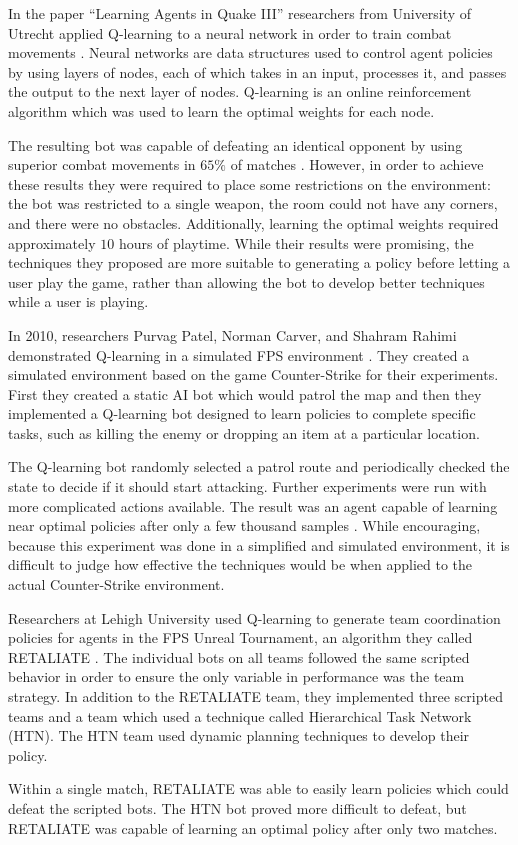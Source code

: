 In the paper ``Learning Agents in Quake III'' researchers from University of Utrecht applied Q-learning to a neural network in order to train combat movements \cite{q3combat}. Neural networks are data structures used to control agent policies by using layers of nodes, each of which takes in an input, processes it, and passes the output to the next layer of nodes. Q-learning is an online reinforcement algorithm which was used to learn the optimal weights for each node.

The resulting bot was capable of defeating an identical opponent by using superior combat movements in $65\%$ of matches \cite{q3combat}. However, in order to achieve these results they were required to place some restrictions on the environment: the bot was restricted to a single weapon, the room could not have any corners, and there were no obstacles. Additionally, learning the optimal weights required approximately $10$ hours of playtime. While their results were promising, the techniques they proposed are more suitable to generating a policy before letting a user play the game, rather than allowing the bot to develop better techniques while a user is playing.

In 2010, researchers Purvag Patel, Norman Carver, and Shahram Rahimi demonstrated Q-learning in a simulated FPS environment \cite{game:ai:learning}. They created a simulated environment based on the game Counter-Strike for their experiments. First they created a static AI bot which would patrol the map and then they implemented a Q-learning bot designed to learn policies to complete specific tasks, such as killing the enemy or dropping an item at a particular location.

The Q-learning bot randomly selected a patrol route and periodically checked the state to decide if it should start attacking. Further experiments were run with more complicated actions available. The result was an agent capable of learning near optimal policies after only a few thousand samples \cite{game:ai:learning}. While encouraging, because this experiment was done in a simplified and simulated environment, it is difficult to judge how effective the techniques would be when applied to the actual Counter-Strike environment.

Researchers at Lehigh University used Q-learning to generate team coordination policies for agents in the FPS Unreal Tournament, an algorithm they called RETALIATE \cite{retaliate}. The individual bots on all teams followed the same scripted behavior in order to ensure the only variable in performance was the team strategy. In addition to the RETALIATE team, they implemented three scripted teams and a team which used a technique called Hierarchical Task Network (HTN). The HTN team used dynamic planning techniques to develop their policy.

Within a single match, RETALIATE was able to easily learn policies which could defeat the scripted bots. The HTN bot proved more difficult to defeat, but RETALIATE was capable of learning an optimal policy after only two matches.